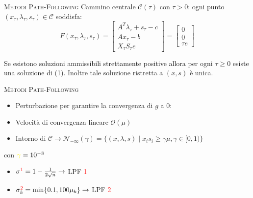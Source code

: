 \begin{frame}[t]{\textsc{\LARGE \textcolor{burntumber}{Metodi Path-Following}}}
	Cammino centrale $\mathcal{C}(\tau)$ con $\tau  > 0$: ogni punto $(x_{\tau}, \lambda_{\tau}, s_{\tau})\in \mathcal{C}$ soddisfa:
\begin{equation}\label{Ftao}\tag{1}
\mathit{F}(x_{\tau},\lambda_{\tau},s_{\tau})= \begin{bmatrix}
A^{T}\lambda_{\tau}+s_{\tau}-c \\Ax_{\tau}-b \\X_{\tau}S_{\tau}e
\end{bmatrix}=\begin{bmatrix}0\\0\\ \tau e \end{bmatrix}
\end{equation}

\begin{theorem}
	Se esistono soluzioni ammissibili strettamente positive allora per ogni $\tau\geq0$ esiste una soluzione di (1). Inoltre tale
	soluzione ristretta a $(x, s)$ è unica.
\end{theorem}
\end{frame}


\begin{frame}{\textsc{\LARGE \textcolor{burntumber}{Metodi Path-Following}}}

\begin{itemize}
	\item Perturbazione per garantire la convergenza di $g$ a $0$:
\end{itemize}
\pause
{}
\pause

\begin{itemize}
\item Velocità di convergenza lineare $\mathcal{O}(\mu)$
\pause
\item Intorno di $\mathcal{C}\rightarrow \mathcal{N}_{-\infty}(\gamma) =\{ (x, \lambda,s)\;|\; x_{i}s_{i} \geq \gamma \mu, \gamma \in [0,1)\}$
\end{itemize}
\;\;\;\;\;\;\;\;\;\;\;\;\;\;\;\;\;\;\;\;\;\;\;\;\;\;\;\;con $ \textcolor{yellow}{\mathbf{\gamma}}=10^{-3}$
\begin{itemize}
	\item[] \;\;\;\;\;\;\;\;\;\;\;\;\;\;\;\;\;\;\;\;\;\;\;\;\;$\sigma^{\textcolor{red}{1}} = 1 -\frac{1}{2\sqrt{n}}\rightarrow$\textrm{ LPF \textcolor{red}{1}}\pause
	\item[] \;\;\;\;\;\;\;\;\;\;\;\;\;\;\;\;\;\;\;\;\;\;\;\;\;$\sigma^{\textcolor{red}{2}}_{k} = \min\{0.1, 100\mu_{k}\}\rightarrow$\textrm{ LPF \textcolor{red}{2}}\pause	
\end{itemize}
\end{frame}

